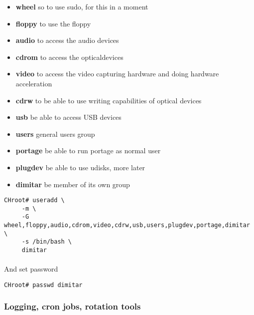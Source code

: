 \documentclass[10pt,a4paper]{article}
\begin{document}
                    \begin{itemize}
                        \item \textbf{wheel} so to use sudo, for this in a moment
                        \item \textbf{floppy} to use the floppy
                        \item \textbf{audio} to access the audio devices
                        \item \textbf{cdrom} to access the opticaldevices
                        \item \textbf{video} to access the video capturing hardware and doing hardware acceleration
                        \item \textbf{cdrw} to be able to use writing capabilities of optical devices
                        \item \textbf{usb} be able to access USB devices
                        \item \textbf{users} general users group
                        \item \textbf{portage} be able to run portage as normal user
                        \item \textbf{plugdev} be able to use udisks, more later
                        \item \textbf{dimitar} be member of its own group
                    \end{itemize}
                    
                    \begin{lstlisting}[style=BashInputCHRoot]
 CHroot# useradd \
     -m \
     -G wheel,floppy,audio,cdrom,video,cdrw,usb,users,plugdev,portage,dimitar \
     -s /bin/bash \
     dimitar
                    \end{lstlisting}
                    
                    \paragraph{} And set password

                    \begin{lstlisting}[style=BashInputCHRoot]
 CHroot# passwd dimitar
                    \end{lstlisting}
                
                \newpage
                \subsubsection{Logging, cron jobs, rotation tools}
                    
\end{document}
